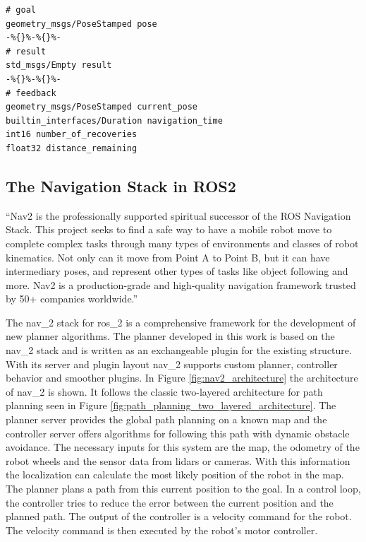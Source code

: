 \begin{lstlisting}
# goal
geometry_msgs/PoseStamped pose
-%{}%-%{}%-
# result
std_msgs/Empty result
-%{}%-%{}%-
# feedback
geometry_msgs/PoseStamped current_pose
builtin_interfaces/Duration navigation_time
int16 number_of_recoveries
float32 distance_remaining
\end{lstlisting}
    
\subsection{The Navigation Stack in ROS2}
\label{sec:navigation_stack}

\begin{displayquote}
    \enquote{Nav2 is the professionally supported spiritual successor of the ROS Navigation Stack. This project seeks to find a safe way to have a mobile robot move to complete complex tasks through many types of environments and classes of robot kinematics. Not only can it move from Point A to Point B, but it can have intermediary poses, and represent other types of tasks like object following and more. Nav2 is a production-grade and high-quality navigation framework trusted by 50+ companies worldwide.} \cite{steve_macenski_navigation_2020}
\end{displayquote}

The \gls{nav_2} stack for \gls{ros_2} is a comprehensive framework for the development of new planner algorithms. The planner developed in this work is based on the \gls{nav_2} stack and is written as an exchangeable plugin for the existing structure. With its server and plugin layout \gls{nav_2} supports custom planner, controller behavior and smoother plugins. In Figure \ref{fig:nav2_architecture} the architecture of \gls{nav_2} is shown. It follows the classic two-layered architecture for path planning seen in Figure \ref{fig:path_planning_two_layered_architecture}. The planner server provides the global path planning on a known map and the controller server offers algorithms for following this path with dynamic obstacle avoidance. The necessary inputs for this system are the map, the odometry of the robot wheels and the sensor data from lidars or cameras. With this information the localization can calculate the most likely position of the robot in the map. The planner plans a path from this current position to the goal. In a control loop, the controller tries to reduce the error between the current position and the planned path. The output of the controller is a velocity command for the robot. The velocity command is then executed by the robot's motor controller.


